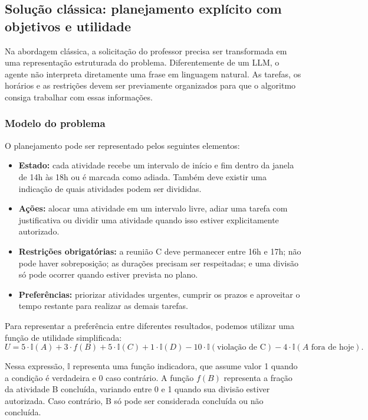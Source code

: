 \documentclass[12pt, a4paper]{article}
\begin{document}
\subsection{Solução clássica: planejamento explícito com objetivos e utilidade}

Na abordagem clássica, a solicitação do professor precisa ser transformada em uma representação estruturada do problema. Diferentemente de um LLM, o agente não interpreta diretamente uma frase em linguagem natural. As tarefas, os horários e as restrições devem ser previamente organizados para que o algoritmo consiga trabalhar com essas informações.

\subsubsection{Modelo do problema}

O planejamento pode ser representado pelos seguintes elementos:
\begin{itemize}[leftmargin=2em]
  \item \textbf{Estado:} cada atividade recebe um intervalo de início e fim dentro da janela de 14h às 18h ou é marcada como adiada. Também deve existir uma indicação de quais atividades podem ser divididas.
  \item \textbf{Ações:} alocar uma atividade em um intervalo livre, adiar uma tarefa com justificativa ou dividir uma atividade quando isso estiver explicitamente autorizado.
  \item \textbf{Restrições obrigatórias:} a reunião C deve permanecer entre 16h e 17h; não pode haver sobreposição; as durações precisam ser respeitadas; e uma divisão só pode ocorrer quando estiver prevista no plano.
  \item \textbf{Preferências:} priorizar atividades urgentes, cumprir os prazos e aproveitar o tempo restante para realizar as demais tarefas.
\end{itemize}

Para representar a preferência entre diferentes resultados, podemos utilizar uma função de utilidade simplificada:
\begin{equation}
U = 5\cdot\mathbb{I}(A) + 3\cdot f(B) + 5\cdot\mathbb{I}(C) + 1\cdot\mathbb{I}(D)
- 10\cdot\mathbb{I}(\text{violação de C}) - 4\cdot\mathbb{I}(A\text{ fora de hoje}).
\end{equation}

Nessa expressão, \(\mathbb{I}\) representa uma função indicadora, que assume valor 1 quando a condição é verdadeira e 0 caso contrário. A função \(f(B)\) representa a fração da atividade B concluída, variando entre 0 e 1 quando sua divisão estiver autorizada. Caso contrário, B só pode ser considerada concluída ou não concluída.
\end{document}
